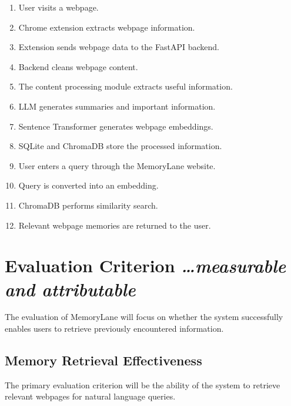 \documentclass[11pt,a4paper]{article}
\newcommand{\BvrHint}[1]{%
  {\normalfont\normalsize\itshape\hfill #1}}
\begin{document}
\begin{enumerate}[leftmargin=0.7cm]

\item User visits a webpage.

\item Chrome extension extracts webpage information.

\item Extension sends webpage data to the FastAPI backend.

\item Backend cleans webpage content.

\item The content processing module extracts useful information.

\item LLM generates summaries and important information.

\item Sentence Transformer generates webpage embeddings.

\item SQLite and ChromaDB store the processed information.

\item User enters a query through the MemoryLane website.

\item Query is converted into an embedding.

\item ChromaDB performs similarity search.

\item Relevant webpage memories are returned to the user.

\end{enumerate}


\section{Evaluation Criterion %
\BvrHint{\ldots measurable and attributable}}

The evaluation of MemoryLane will focus on whether the system successfully enables users to retrieve previously encountered information.


\subsection{Memory Retrieval Effectiveness}

The primary evaluation criterion will be the ability of the system to retrieve relevant webpages for natural language queries.
\end{document}

